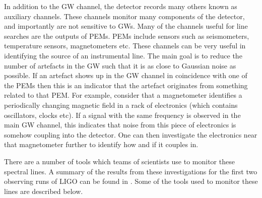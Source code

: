 %
In addition to the \gls{GW} channel, the detector
records many others known as auxiliary channels.  These channels
monitor many components of the detector, and importantly are not sensitive to
\glspl{GW}.  Many of the channels useful for line searches are the outputs of \glspl{PEM}.
\glspl{PEM} include sensors such as seismometers, temperature sensors,
magnetometers etc.  These channels can be very useful in identifying the source
of an instrumental line.  The main goal is to reduce the number of artefacts in
the \gls{GW} such that it is as close to Gaussian noise as possible.  If an
artefact shows up in the \gls{GW} channel in coincidence with one of the
\glspl{PEM} then this is an indicator that the artefact originates from something
related to that \gls{PEM}.  For example, consider
that a magnetometer identifies a periodically changing magnetic field in a rack of electronics (which contains oscillators, clocks etc). If a signal with the same frequency is observed in the main \gls{GW} channel, this indicates that noise from this piece of electronics is somehow coupling into the detector.  One can then investigate the electronics near that magnetometer further to identify how and if it couples in.

%

There are a number of tools which teams of scientists use to monitor these spectral lines.
A summary of the results from these investigations for the first two observing runs of \gls{LIGO} can be found in
\citep{covas2018IdentificationMitigation}.  Some of the tools used to monitor these lines are
described below.

